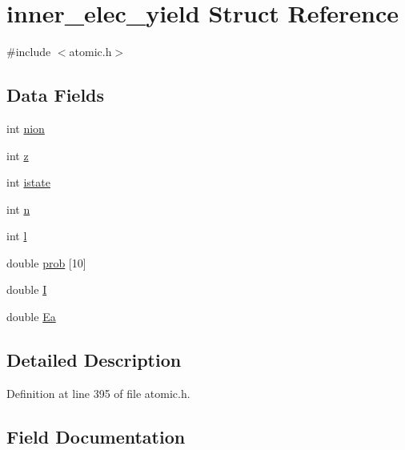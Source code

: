 \hypertarget{structinner__elec__yield}{}\section{inner\+\_\+elec\+\_\+yield Struct Reference}
\label{structinner__elec__yield}


{\ttfamily \#include $<$atomic.\+h$>$}

\subsection*{Data Fields}
\begin{DoxyCompactItemize}
\item 
int \hyperlink{structinner__elec__yield_ab2beeab8a3db4cbef0ff6c93a699743b}{nion}
\item 
int \hyperlink{structinner__elec__yield_a0e6a483b5c4f512c7569c1b88b186d59}{z}
\item 
int \hyperlink{structinner__elec__yield_a61f5359ceb8e8e5c0a5e2f75b8f19cf3}{istate}
\item 
int \hyperlink{structinner__elec__yield_aabc012a08393c7e3cac5b82314dce446}{n}
\item 
int \hyperlink{structinner__elec__yield_ae91eb333576f62f1dcbfe9d4743da47c}{l}
\item 
double \hyperlink{structinner__elec__yield_af672262c13778c895c5aa2d0453a843a}{prob} \mbox{[}10\mbox{]}
\item 
double \hyperlink{structinner__elec__yield_a92b11e501d7ead3316b2ec82a10b53c8}{I}
\item 
double \hyperlink{structinner__elec__yield_acab6deb93520ea41510fda43d9486d8c}{Ea}
\end{DoxyCompactItemize}


\subsection{Detailed Description}


Definition at line 395 of file atomic.\+h.



\subsection{Field Documentation}
\mbox{\label{structinner__elec__yield_acab6deb93520ea41510fda43d9486d8c}} 
